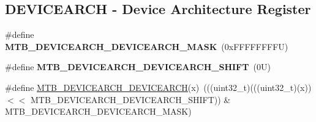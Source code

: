 \subsection*{D\+E\+V\+I\+C\+E\+A\+R\+CH -\/ Device Architecture Register}
\begin{DoxyCompactItemize}
\item 
\mbox{\label{group___m_t_b___register___masks_gaeae6cf618fbfa18ac171477644ef4eb6}} 
\#define {\bfseries M\+T\+B\+\_\+\+D\+E\+V\+I\+C\+E\+A\+R\+C\+H\+\_\+\+D\+E\+V\+I\+C\+E\+A\+R\+C\+H\+\_\+\+M\+A\+SK}~(0x\+F\+F\+F\+F\+F\+F\+F\+F\+U)
\item 
\mbox{\label{group___m_t_b___register___masks_ga80261ce3e90659fbc1f5c9e2dd2867f8}} 
\#define {\bfseries M\+T\+B\+\_\+\+D\+E\+V\+I\+C\+E\+A\+R\+C\+H\+\_\+\+D\+E\+V\+I\+C\+E\+A\+R\+C\+H\+\_\+\+S\+H\+I\+FT}~(0\+U)
\item 
\#define \mbox{\hyperlink{group___m_t_b___register___masks_gac8fd3715da706f4ba8e69e23312ddbff}{M\+T\+B\+\_\+\+D\+E\+V\+I\+C\+E\+A\+R\+C\+H\+\_\+\+D\+E\+V\+I\+C\+E\+A\+R\+CH}}(x)~(((uint32\+\_\+t)(((uint32\+\_\+t)(x)) $<$$<$ M\+T\+B\+\_\+\+D\+E\+V\+I\+C\+E\+A\+R\+C\+H\+\_\+\+D\+E\+V\+I\+C\+E\+A\+R\+C\+H\+\_\+\+S\+H\+I\+FT)) \& M\+T\+B\+\_\+\+D\+E\+V\+I\+C\+E\+A\+R\+C\+H\+\_\+\+D\+E\+V\+I\+C\+E\+A\+R\+C\+H\+\_\+\+M\+A\+SK)
\end{DoxyCompactItemize}
